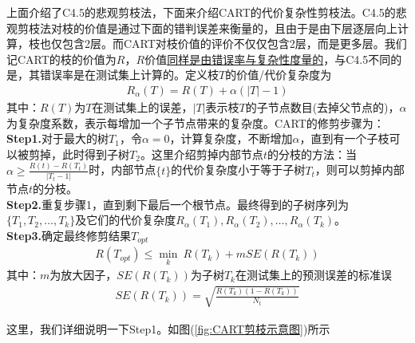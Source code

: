             \par
            上面介绍了C4.5的悲观剪枝法，下面来介绍CART的代价复杂性剪枝法。C4.5的悲观剪枝法对枝的价值是通过下面的错判误差来衡量的，且由于是由下层逐层向上计算，枝也仅包含2层。而CART对枝价值的评价不仅仅包含2层，而是更多层。我们记CART的枝的价值为$R$，$R$价值\uline{同样是由错误率与复杂性度量的}，与C4.5不同的是，其错误率是在测试集上计算的。定义枝$T$的价值/代价复杂度为
            \begin{align*}
            R_\alpha(T) = R(T)+\alpha(|T| - 1)
            \end{align*}
            其中：$R(T)$为$T$在测试集上的误差，$|T|$表示枝$T$的子节点数目(去掉父节点的)，$\alpha$为复杂度系数，表示每增加一个子节点带来的复杂度。CART的修剪步骤为：\\
            \textbf{Step1.}对于最大的树$T_1$，令$\alpha=0$，计算复杂度，不断增加$\alpha$，直到有一个子枝可以被剪掉，此时得到子树$T_2$。这里介绍剪掉内部节点$t$的分枝的方法：当$\alpha \geqslant \frac{R(t)-R(T_t)}{|T_t-1|}$时，内部节点$\{t\}$的代价复杂度小于等于子树$T_t$，则可以剪掉内部节点$t$的分枝。\\
            \textbf{Step2.}重复步骤1，直到剩下最后一个根节点。最终得到的子树序列为$\{T_1,T_2,\dots,T_k\}$及它们的代价复杂度$R_\alpha(T_1),R_\alpha(T_2),\dots,R_\alpha(T_k)$。\\
            \textbf{Step3.}确定最终修剪结果$T_{opt}$
            \begin{align*}
            R(T_{opt}) \leqslant \min_k \ R(T_k) + m SE(R(T_k))
            \end{align*}
            其中：$m$为放大因子，$SE(R(T_k))$为子树$T_k$在测试集上的预测误差的标准误
            \begin{align*}
            SE(R(T_k)) = \sqrt{\frac{R(T_k)(1-R(T_k))}{N_t}}
            \end{align*}
            \par
            这里，我们详细说明一下Step1。如图(\ref{fig:CART剪枝示意图})所示
